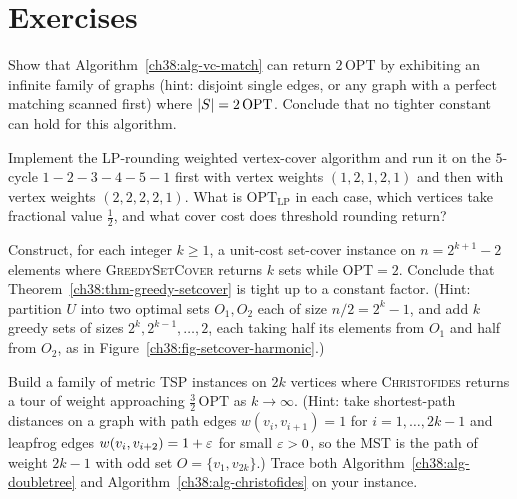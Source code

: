 \section{Exercises}

\begin{exercise}\label{ch38:ex-vc-tight}
Show that Algorithm~\ref{ch38:alg-vc-match} can return $2\,\mathrm{OPT}$ by exhibiting an infinite family
of graphs (hint: disjoint single edges, or any graph with a perfect matching scanned first) where $\lvert S\rvert=2\,\mathrm{OPT}$.
Conclude that no tighter constant can hold for this algorithm.
\end{exercise}

\begin{exercise}\label{ch38:ex-vc-weighted}
Implement the LP-rounding weighted vertex-cover algorithm and run it on the $5$-cycle $1\!-\!2\!-\!3\!-\!4\!-\!5\!-\!1$
first with vertex weights $(1,2,1,2,1)$ and then with vertex weights $(2,2,2,2,1)$. What is $\mathrm{OPT}_{\mathrm{LP}}$
in each case, which vertices take fractional value $\tfrac12$, and what cover cost does threshold rounding return?
\end{exercise}

\begin{exercise}\label{ch38:ex-setcover-tight}
Construct, for each integer $k\ge 1$, a unit-cost set-cover instance on $n=2^{k+1}-2$ elements where
\textsc{GreedySetCover} returns $k$ sets while $\mathrm{OPT}=2$. Conclude that Theorem~\ref{ch38:thm-greedy-setcover}
is tight up to a constant factor. (Hint: partition $U$ into two optimal sets $O_1,O_2$ each of size $n/2 = 2^k - 1$,
and add $k$ greedy sets of sizes $2^k, 2^{k-1}, \dots, 2$, each taking half its elements from $O_1$ and half from $O_2$,
as in Figure~\ref{ch38:fig-setcover-harmonic}.)
\end{exercise}

\begin{exercise}\label{ch38:ex-christofides-tight}
Build a family of metric TSP instances on $2k$ vertices where \textsc{Christofides} returns a tour of weight
approaching $\tfrac32\,\mathrm{OPT}$ as $k\to\infty$. (Hint: take shortest-path distances on a graph with path
edges $w(v_i,v_{i+1})=1$ for $i=1,\dots,2k-1$ and leapfrog edges $w(v_i,v_{i+2})=1+\varepsilon$ for small $\varepsilon>0$,
so the MST is the path of weight $2k-1$ with odd set $O=\{v_1,v_{2k}\}$.) Trace both Algorithm~\ref{ch38:alg-doubletree}
and Algorithm~\ref{ch38:alg-christofides} on your instance.
\end{exercise}


